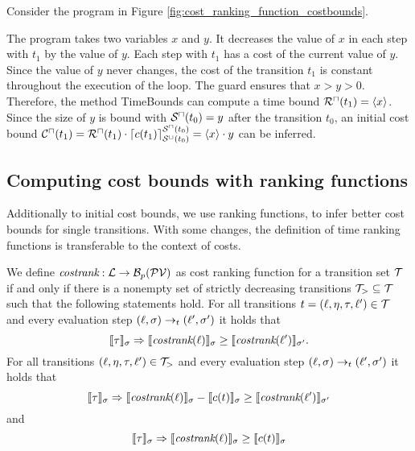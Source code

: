 \begin{example}
  Consider the program in Figure \ref{fig:cost_ranking_function_costbounds}.
  
  The program takes two variables $x$ and $y$.
  It decreases the value of $x$ in each step with $t_1$ by the value of $y$.
  Each step with $t_1$ has a cost of the current value of $y$.
  Since the value of $y$ never changes, the cost of the transition $t_1$ is constant throughout the execution of the loop.
  The guard ensures that $x > y > 0$.
  Therefore, the method TimeBounds can compute a time bound ${\mathcal{R}^\sqcap}(t_1) = \langle x\rangle$.
  Since the size of $y$ is bound with ${\mathcal{S}^\sqcap}(t_0) = y$ after the transition $t_0$, an initial cost bound ${\mathcal{C}^\sqcap}(t_1) = {\mathcal{R}^\sqcap}(t_1) \cdot \lceil c(t_1) \rceil^{{\mathcal{S}^\sqcap}(t_0)}_{{\mathcal{S}^\sqcup}(t_0)} = \langle x\rangle \cdot y$ can be inferred.
\end{example}

\subsection{Computing cost bounds with ranking functions}

Additionally to initial cost bounds, we use ranking functions, to infer better cost bounds for single transitions.
With some changes, the definition of time ranking functions is transferable to the context of costs.

\begin{definition} 
  We define $\emph{costrank}: \mathcal{L} \rightarrow \mathcal{B}_p(\mathcal{PV})$ as cost ranking function for a transition set $\mathcal{T}$ if and only if there is a nonempty set of strictly decreasing transitions $\mathcal{T}_{>} \subseteq \mathcal{T}$ such that the following statements hold.
  For all transitions $t = (\ell, \eta, \tau, \ell') \in \mathcal{T}$ and every evaluation step $(\ell, \sigma) \rightarrow_t (\ell', \sigma')$ it holds that
  \[ \llbracket \tau \rrbracket_{\sigma} \Rightarrow \llbracket \emph{costrank}(\ell) \rrbracket_{\sigma} \geq \llbracket \emph{costrank}(\ell') \rrbracket_{\sigma'}. \]
  For all transitions $(\ell, \eta, \tau, \ell') \in \mathcal{T}_{>}$ and every evaluation step $(\ell, \sigma) \rightarrow_t (\ell', \sigma')$ it holds that        
  \[ \llbracket \tau \rrbracket_{\sigma} \Rightarrow \llbracket \emph{costrank}(\ell) \rrbracket_{\sigma} - \llbracket c(t) \rrbracket_{\sigma} \geq \llbracket \emph{costrank}(\ell') \rrbracket_{\sigma'} \]
  and
  \[ \llbracket \tau \rrbracket_{\sigma} \Rightarrow \llbracket \emph{costrank}(\ell) \rrbracket_{\sigma} \geq \llbracket c(t) \rrbracket_{\sigma} \]
\end{definition}

